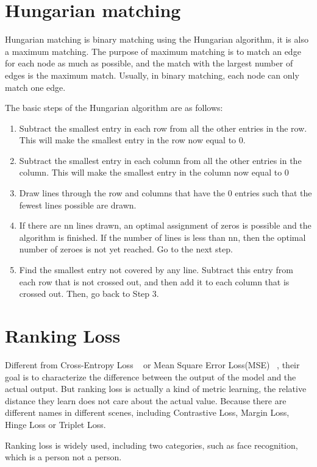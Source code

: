 \section{Hungarian matching}

Hungarian matching is binary matching using the Hungarian algorithm, it is also a maximum matching. The purpose of maximum matching is to match an edge for each node as much as possible, and the match with the largest number of edges is the maximum match. Usually, in binary matching, each node can only match one edge.

The basic steps of the Hungarian algorithm are as follows:
\begin{enumerate}[1.]
	\item Subtract the smallest entry in each row from all the other entries in the row. This will make the smallest entry in the row now equal to 0.
	\item Subtract the smallest entry in each column from all the other entries in the column. This will make the smallest entry in the column now equal to 0
	\item Draw lines through the row and columns that have the 0 entries such that the fewest lines possible are drawn.
	\item  If there are nn lines drawn, an optimal assignment of zeros is possible and the algorithm is finished. If the number of lines is less than nn, then the optimal number of zeroes is not yet reached. Go to the next step.
	\item Find the smallest entry not covered by any line. Subtract this entry from each row that is not  crossed out, and then add it to each column that is crossed out. Then, go back to Step 3.
\end{enumerate}


\section{Ranking Loss}

Different from Cross-Entropy Loss ~\cite{Categorical_Loss} or Mean Square Error Loss(MSE) ~\cite{CHRISTOFFERSEN2004291}, their goal is to characterize the difference between the output of the model and the actual output. But ranking loss is actually a kind of metric learning, the relative distance they learn does not care about the actual value. Because there are different names in different scenes, including Contrastive Loss, Margin Loss, Hinge Loss or Triplet Loss.

Ranking loss is widely used, including two categories, such as face recognition, which is a person not a person.

